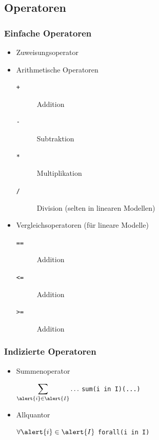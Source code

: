 \subsection{Operatoren}
\begin{frame}
 \frametitle{Einfache Operatoren}
 \begin{itemize}
  \item Zuweisungsoperator \structure{\texttt{=}}
  \item Arithmetische Operatoren
  \begin{description}
   \item[\texttt{+}] Addition
   \item[\texttt{-}] Subtraktion
   \item[\texttt{*}] Multiplikation
   \item[\texttt{/}] Division (selten in linearen Modellen)
  \end{description}
  \item Vergleichsoperatoren (für lineare Modelle)
  \begin{description}
   \item[\texttt{==}] Addition
   \item[\texttt{<=}] Addition
   \item[\texttt{>=}] Addition
  \end{description}
 \end{itemize}
\end{frame}

\begin{frame}
 \frametitle{Indizierte Operatoren}
 \begin{itemize}
  \item Summenoperator
  \begin{flushleft}\Large
   {$\displaystyle\sum_{\alert{i}\in \alert{I}}\ldots$} 
   \textrightarrow{} 
   { \texttt{sum(\alert{i} in \alert{I})(\textsf{...})}}
  \end{flushleft}
  \medskip
  \item Allquantor
  \begin{flushleft}\Large
   {$\displaystyle\forall {\alert{i}\in \alert{I}}$} 
   \textrightarrow{} 
   { \texttt{forall(\alert{i} in \alert{I})}}
  \end{flushleft}
 \end{itemize}

\end{frame}


